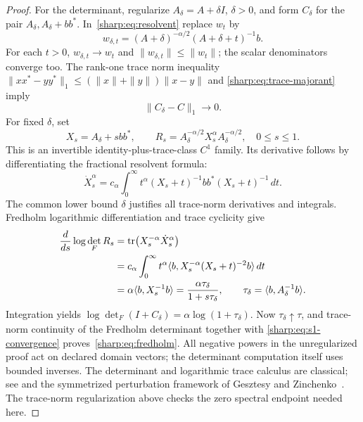 \begin{proof}
For the determinant, regularize $A_\delta=A+\delta I$, $\delta>0$,
and form $C_\delta$ for the pair $A_\delta,A_\delta+bb^*$.
In~\eqref{sharp:eq:resolvent} replace $w_t$ by
\[
 w_{\delta,t}=(A+\delta)^{-\alpha/2}(A+\delta+t)^{-1}b.
\]
For each $t>0$, $w_{\delta,t}\to w_t$ and
$\|w_{\delta,t}\|\le\|w_t\|$; the scalar denominators converge too.
The rank-one trace norm inequality
$\|xx^*-yy^*\|_1\le(\|x\|+\|y\|)\|x-y\|$ and
\eqref{sharp:eq:trace-majorant} imply
\begin{equation}\label{sharp:eq:s1-convergence}
                     \|C_\delta-C\|_1\longrightarrow0.
\end{equation}
For fixed $\delta$, set
\[
 X_s=A_\delta+sbb^*,\qquad
 R_s=A_\delta^{-\alpha/2}X_s^\alpha A_\delta^{-\alpha/2},
                  \quad 0\le s\le1.
\]
This is an invertible identity-plus-trace-class $C^1$ family. Its
derivative follows by differentiating the fractional resolvent formula:
\[
 \dot X_s^\alpha=c_\alpha\int_0^\infty
        t^\alpha(X_s+t)^{-1}bb^*(X_s+t)^{-1}\,dt.
\]
The common lower bound $\delta$ justifies all trace-norm derivatives
and integrals. Fredholm logarithmic differentiation and trace cyclicity
give
\begin{align*}
 \frac{d}{ds}\log\det_F R_s
 &=\operatorname{tr}\bigl(X_s^{-\alpha}\dot X_s^\alpha\bigr)\\
 &=c_\alpha\int_0^\infty t^\alpha
        \langle b,X_s^{-\alpha}(X_s+t)^{-2}b\rangle\,dt\\
 &=\alpha\langle b,X_s^{-1}b\rangle
   =\frac{\alpha\tau_\delta}{1+s\tau_\delta},
       \qquad\tau_\delta=\langle b,A_\delta^{-1}b\rangle.
\end{align*}
Integration yields $\log\det_F(I+C_\delta)
=\alpha\log(1+\tau_\delta)$. Now $\tau_\delta\uparrow\tau$, and
trace-norm continuity of the Fredholm determinant together with
\eqref{sharp:eq:s1-convergence} proves~\eqref{sharp:eq:fredholm}.
All negative powers in the unregularized proof act on declared domain
vectors; the determinant computation itself uses bounded inverses.
The determinant and logarithmic trace calculus are classical; see
\cite[Sections 3--4]{Bornemann} and the symmetrized perturbation framework
of Gesztesy and Zinchenko~\cite{GZ}. The trace-norm regularization above
checks the zero spectral endpoint needed here.
\end{proof}

